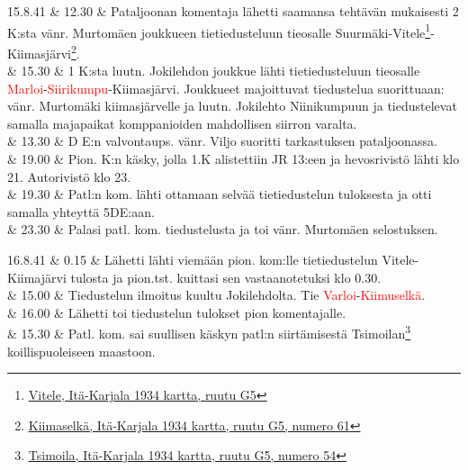 \documentclass[11pt,a5paper,oneside]{book}
\begin{document}
15.8.41 & 12.30 & Pataljoonan komentaja lähetti saamansa tehtävän mukaisesti 2 K:sta vänr. Murtomäen joukkueen tietiedusteluun tieosalle Suurmäki-Vitele\footnote{\href{https://www.google.fi/maps/place/Vidlitsa,+Republic+of+Karelia,+Russia,+186007/}{Vitele, Itä-Karjala 1934 kartta, ruutu G5}}-Kiimasjärvi\footnote{\href{https://www.google.fi/maps/place/Kimusel'gskoye/@61.200226,32.7254117,16z/}{Kiimaselkä, Itä-Karjala 1934 kartta, ruutu G5, numero 61}}. \\

& 15.30 & 1 K:sta luutn. Jokilehdon joukkue lähti tietiedusteluun tieosalle \textcolor{red}{Marloi}-\textcolor{red}{Siirikumpu}-Kiimasjärvi. \newline Joukkueet majoittuvat tiedustelua suorittuaan: vänr. Murtomäki kiimasjärvelle ja luutn. Jokilehto Niinikumpuun ja tiedustelevat samalla majapaikat komppanioiden mahdollisen siirron varalta. \\

& 13.30 & D E:n valvontaups. vänr. Viljo suoritti tarkastuksen pataljoonassa. \\

& 19.00 & Pion. K:n käsky, jolla 1.K alistettiin JR 13:een ja hevosrivistö lähti klo 21. Autorivistö klo 23. \\

& 19.30 & Patl:n kom. lähti ottamaan selvää tietiedustelun tuloksesta ja otti samalla yhteyttä 5DE:aan. \\

& 23.30 & Palasi patl. kom. tiedustelusta ja toi vänr. Murtomäen selostuksen. \\

\taulustop


16.8.41 & 0.15 & Lähetti lähti viemään pion. kom:lle tietiedustelun Vitele-Kiimajärvi tulosta ja pion.tst. kuittasi sen vastaanotetuksi klo 0.30. \\

& 15.00 & Tiedustelun ilmoitus kuultu Jokilehdolta. Tie \textcolor{red}{Varloi}-\textcolor{red}{Kiimuselkä}. \\

& 16.00 & Lähetti toi tiedustelun tulokset pion komentajalle. \\

& 15.30 & Patl. kom. sai suullisen käskyn patl:n siirtämisestä Tsimoilan\footnote{\href{https://www.google.fi/maps/place/61\%C2\%B013'40.5\%22N+32\%C2\%B044'50.1\%22E/@61.227911,32.7450663,906m/}{Tsimoila, Itä-Karjala 1934 kartta, ruutu G5, numero 54}} koillispuoleiseen maastoon. \\
\end{document}
